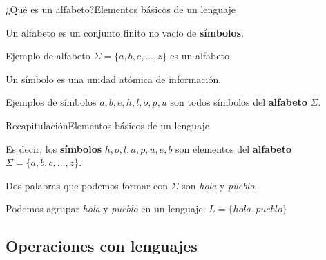 \documentclass[spanish, handout]{beamer}
\begin{document}
\begin{frame}{¿Qué es un alfabeto?}{Elementos básicos de un lenguaje}

    \begin{definition}
        Un \alert{alfabeto} es un conjunto finito no vacío de \textbf{símbolos}.
    \end{definition} \pause

    \bigskip

    \begin{exampleblock}{Ejemplo de alfabeto}
        $ \Sigma = \{ a, b, c, \dots , z \} $ es un alfabeto 
    \end{exampleblock} \pause

    \bigskip

    \begin{definition}
        Un \alert{símbolo} es una unidad atómica de información.
    \end{definition} \pause

    \bigskip

    \begin{exampleblock}{Ejemplos de símbolos}
        $a, b, e, h, l, o, p, u$ son todos símbolos del \textbf{alfabeto} $\Sigma$.
    \end{exampleblock}
    
\end{frame}

\begin{frame}{Recapitulación}{Elementos básicos de un lenguaje}

    Es decir, los \textbf{símbolos} $h, o, l, a, p, u, e, b$ son elementos del \textbf{alfabeto} $\Sigma = \{a, b, c, \dots , z\}$. \pause
    
    \bigskip

    Dos palabras que podemos formar con $\Sigma$ son \textit{hola} y \textit{pueblo}. \pause

    \bigskip

    Podemos agrupar \textit{hola} y \textit{pueblo} en un lenguaje: $L = \{hola, pueblo\}$
\end{frame}

\subsection{Operaciones con lenguajes}
\label{subsec:lang-ops}
\end{document}
